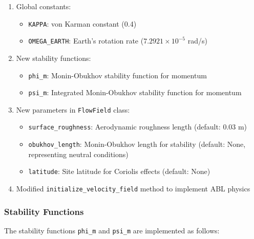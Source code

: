 \documentclass{article}
\begin{document}
\begin{enumerate}[label=\arabic*.]
\item
  Global constants:

  \begin{itemize}[label=\textbullet]
  \item
    \texttt{KAPPA}: von Karman constant (0.4)
  \item
    \texttt{OMEGA\_EARTH}: Earth's rotation rate ($7.2921\times10^{-5}$ rad/s)
  \end{itemize}
\item
  New stability functions:

  \begin{itemize}[label=\textbullet]
  \item
    \texttt{phi\_m}: Monin-Obukhov stability function for momentum
  \item
    \texttt{psi\_m}: Integrated Monin-Obukhov stability function for
    momentum
  \end{itemize}
\item
  New parameters in \texttt{FlowField} class:

  \begin{itemize}[label=\textbullet]
  \item
    \texttt{surface\_roughness}: Aerodynamic roughness length (default:
    0.03 m)
  \item
    \texttt{obukhov\_length}: Monin-Obukhov length for stability
    (default: None, representing neutral conditions)
  \item
    \texttt{latitude}: Site latitude for Coriolis effects (default:
    None)
  \end{itemize}
\item
  Modified \texttt{initialize\_velocity\_field} method to implement ABL
  physics
\end{enumerate}

\hypertarget{stability-functions}{%
\subsubsection{Stability Functions}\label{stability-functions}}

The stability functions \texttt{phi\_m} and \texttt{psi\_m} are
implemented as follows:
\end{document}
